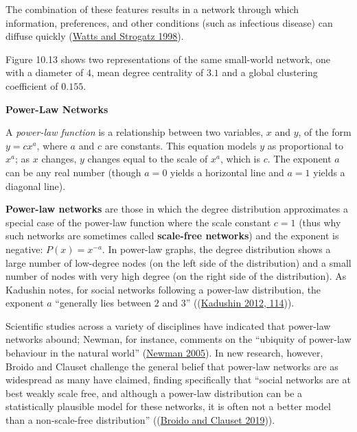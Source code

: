 \documentclass{book}
\begin{document}
The combination of these features results in a network through which
information, preferences, and other conditions (such as infectious disease)
can diffuse quickly (\protect\hyperlink{ref-WattsStrogatz1998}{Watts and
Strogatz 1998}).

Figure 10.13 shows two representations of the same small-world network, one
with a diameter of \(4\), mean degree centrality of \(3.1\) and a global
clustering coefficient of \(0.155\).

\textbf{Power-Law Networks}

A \emph{power-law function} is a relationship between two variables, \(x\) and
\(y\), of the form \(y = cx ^ a\), where \(a\) and \(c\) are constants. This
equation models \(y\) as proportional to \(x ^ a\); as \(x\) changes, \(y\)
changes equal to the scale of \(x ^ a\), which is \(c\). The exponent \(a\)
can be any real number (though \(a = 0\) yields a horizontal line and
\(a = 1\) yields a diagonal line).

\textbf{Power-law networks} are those in which the degree distribution
approximates a special case of the power-law function where the scale constant
\(c = 1\) (thus why such networks are sometimes called \textbf{scale-free
networks}) and the exponent is negative: \(P(x) = x ^ {-a}\). In power-law
graphs, the degree distribution shows a large number of low-degree nodes (on
the left side of the distribution) and a small number of nodes with very high
degree (on the right side of the distribution). As Kadushin notes, for social
networks following a power-law distribution, the exponent \(a\) ``generally
lies between \(2\) and \(3\)'' ((\protect\hyperlink{ref-Kadushin2012}{Kadushin
2012, 114})).

Scientific studies across a variety of disciplines have indicated that
power-law networks abound; Newman, for instance, comments on the ``ubiquity of
power-law behaviour in the natural world''
(\protect\hyperlink{ref-Newman2005}{Newman 2005}). In new research, however,
Broido and Clauset challenge the general belief that power-law networks are as
widespread as many have claimed, finding specifically that ``social networks
are at best weakly scale free, and although a power-law distribution can be a
statistically plausible model for these networks, it is often not a better
model than a non-scale-free distribution''
((\protect\hyperlink{ref-BroidoClauset2019}{Broido and Clauset 2019})).
\end{document}
